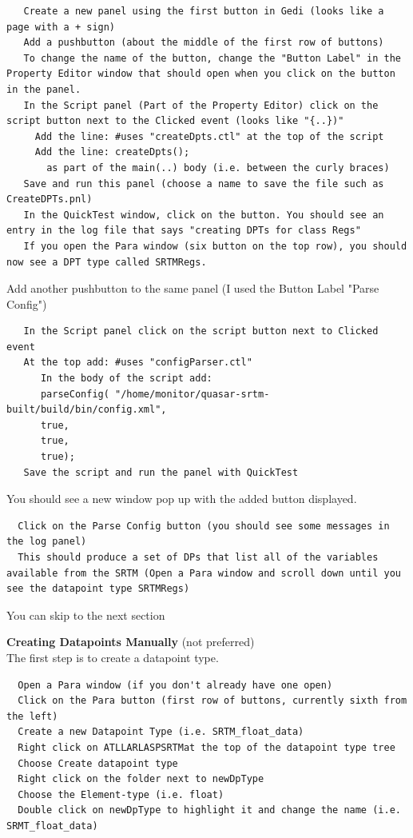 \documentclass[11pt,a4paper]{article}
\begin{document}
 \begin{lstlisting}
   Create a new panel using the first button in Gedi (looks like a page with a + sign)
   Add a pushbutton (about the middle of the first row of buttons)
   To change the name of the button, change the "Button Label" in the Property Editor window that should open when you click on the button in the panel.
   In the Script panel (Part of the Property Editor) click on the script button next to the Clicked event (looks like "{..})"
     Add the line: #uses "createDpts.ctl" at the top of the script
     Add the line: createDpts();
       as part of the main(..) body (i.e. between the curly braces)
   Save and run this panel (choose a name to save the file such as CreateDPTs.pnl)
   In the QuickTest window, click on the button. You should see an entry in the log file that says "creating DPTs for class Regs"
   If you open the Para window (six button on the top row), you should now see a DPT type called SRTMRegs.
\end{lstlisting}

\noindent Add another pushbutton to the same panel (I used the Button Label "Parse Config")
\begin{lstlisting}
   In the Script panel click on the script button next to Clicked event
   At the top add: #uses "configParser.ctl"
      In the body of the script add: 
      parseConfig( "/home/monitor/quasar-srtm-built/build/bin/config.xml",
      true,
      true,
      true);
   Save the script and run the panel with QuickTest
\end{lstlisting}

\noindent You should see a new window pop up with the added button displayed.
\begin{lstlisting}
  Click on the Parse Config button (you should see some messages in the log panel)
  This should produce a set of DPs that list all of the variables available from the SRTM (Open a Para window and scroll down until you see the datapoint type SRTMRegs)
\end{lstlisting} 
  You can skip to the next section 


\noindent\textbf{Creating Datapoints Manually} (not preferred)\\

The first step is to create a datapoint type.

\begin{lstlisting}
  Open a Para window (if you don't already have one open)
  Click on the Para button (first row of buttons, currently sixth from the left)
  Create a new Datapoint Type (i.e. SRTM_float_data)
  Right click on ATLLARLASPSRTMat the top of the datapoint type tree
  Choose Create datapoint type
  Right click on the folder next to newDpType
  Choose the Element-type (i.e. float)
  Double click on newDpType to highlight it and change the name (i.e. SRMT_float_data)
\end{lstlisting}
\end{document}
